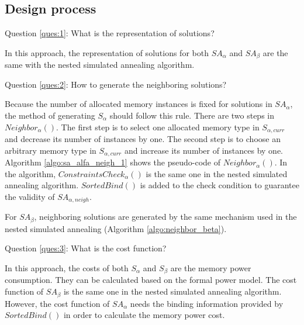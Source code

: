 		\subsection{Design process}
		\label{subsec:design_3}
		Question \ref{ques:1}: What is the representation of solutions?
		
		In this approach, the representation of solutions for both $SA_{\alpha}$
		and $SA_{\beta}$ are the same with the nested simulated annealing algorithm.
		
		Question \ref{ques:2}: How to generate the neighboring solutions?
		
		Because the number of allocated memory instances is fixed for solutions in
		$SA_{\alpha}$, the method of generating $S_{\alpha}$ should follow this rule.
		There are two steps in $Neighbor_{\alpha}()$.
		The first step is to select one allocated memory type in $S_{\alpha,curr}$
		and decrease its number of instances by one.
		The second step is to choose an arbitrary memory type in $S_{\alpha,curr}$
		and increase its number of instances by one.
		Algorithm \ref{algo:sa_alfa_neigh_1} shows the pseudo-code of
		$Neighbor_{\alpha}()$.
		In the algorithm, $ConstraintsCheck_{\alpha}()$ is the same one in the nested
		simulated annealing algorithm. $SortedBind()$ is added to the check condition
		to guarantee the validity of $SA_{\alpha,neigh}$.
		
		
		For $SA_{\beta}$, neighboring solutions are generated by the same mechanism used
		in the nested simulated annealing (Algorithm \ref{algo:neighbor_beta}).
				
		Question \ref{ques:3}: What is the cost function?
		
		In this approach, the costs of both $S_{\alpha}$ and $S_{\beta}$
		are the memory power consumption. They can be calculated based on the formal
		power model. The cost function of $SA_{\beta}$ is the same one in the nested
		simulated annealing algorithm.
		However, the cost function of $SA_{\alpha}$ needs the binding information
		provided by $SortedBind()$ in order to calculate the memory power cost.
		
